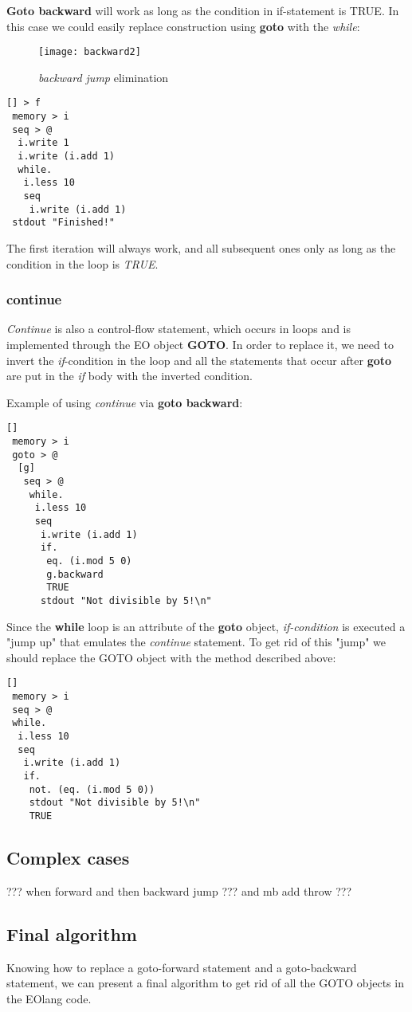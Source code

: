 \documentclass[two column]{article}
\begin{document}
\textbf{Goto backward} will work as long as the condition in if-statement is TRUE. In this case we could easily replace construction using \textbf{goto} with the \textit{while}:

\begin{figure}[h]
    \centering
    \texttt{[image: backward2]}
    \caption{\textit{backward jump} elimination}
    \label{fig:my_label}
\end{figure}

\begin{lstlisting}
[] > f
 memory > i
 seq > @
  i.write 1
  i.write (i.add 1)
  while.
   i.less 10
   seq
    i.write (i.add 1)
 stdout "Finished!"
\end{lstlisting}

The first iteration will always work, and all subsequent ones only as long as the condition in the loop is \textit{TRUE}.

\subsubsection{continue}
\textit{Continue} is also a control-flow statement, which occurs in loops and is implemented through the EO object \textbf{GOTO}. In order to replace it, we need to invert the \textit{if}-condition in the loop and all the statements that occur after \textbf{goto} are put in the \textit{if} body with the inverted condition.

Example of using \textit{continue} via \textbf{goto backward}:
\begin{lstlisting}
[]
 memory > i
 goto > @
  [g]
   seq > @
    while.
     i.less 10
     seq
      i.write (i.add 1)
      if.
       eq. (i.mod 5 0)
       g.backward
       TRUE
      stdout "Not divisible by 5!\n"
\end{lstlisting}

Since the \textbf{while} loop is an attribute of the \textbf{goto} object, \textit{if-condition} is executed a "jump up" that emulates the \textit{continue} statement. To get rid of this "jump" we should replace the GOTO object with the method described above:
\begin{lstlisting}
[]
 memory > i
 seq > @
 while.
  i.less 10
  seq
   i.write (i.add 1)
   if.
    not. (eq. (i.mod 5 0))
    stdout "Not divisible by 5!\n"
    TRUE
\end{lstlisting}

\subsection{Complex cases}
??? when forward and then backward jump
??? and mb add throw ???


\subsection{Final algorithm}
Knowing how to replace a goto-forward statement and a goto-backward statement, we can present a final algorithm to get rid of all the GOTO objects in the EOlang code.
\end{document}
